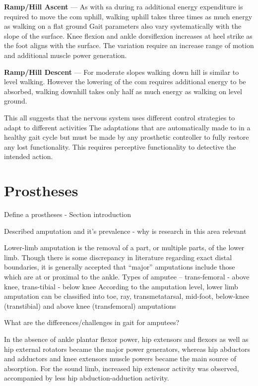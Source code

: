 \textbf{Ramp/Hill Ascent} --- As with \acrshort{sa} during \acrshort{ra} additional energy expenditure is required to move the \acrshort{com} uphill\cite{Franz2012a}, walking uphill takes three times as much energy as walking on a flat ground\cite{Matsumoto2017} Gait parameters also vary systematically with the slope of the surface\cite{Kimel-Naor2017}. Knee flexion and ankle dorsiflexion increases at heel strike as the foot aligns with the surface. The variation require an increase range of motion and additional muscle power generation.\cite{McIntosh2006}

\textbf{Ramp/Hill Descent} --- For moderate slopes walking down hill is similar to level walking. However the lowering of the \acrshort{com} requires additional energy to be absorbed\cite{Franz2012a}, walking downhill takes only half as much energy as walking on level ground\cite{Matsumoto2017}.

This all suggests that the nervous system uses different control strategies to adapt to different activities\cite{Lay2007} The adaptations that are automatically made to in a healthy gait cycle but must be made by any prosthetic controller to fully restore any lost functionality. This requires perceptive functionality to detective the intended action.



\section{Prostheses}
Define a prostheses - Section introduction

Described amputation and it's prevalence - why is research in this area relevant 


Lower-limb amputation is the removal of a part, or multiple parts, of the lower limb. Though there is some discrepancy in literature regarding exact distal boundaries, it is generally accepted that “major” amputations include those which are at or proximal to the ankle.
Types of amputee -- trans-femoral - above knee, trans-tibial - below knee
According to the amputation level, lower limb amputation can be classified into toe, ray, transmetatarsal, mid-foot, below-knee (transtibial) and above knee (transfemoral) amputations

What are the differences/challenges in gait for amputees? 

In the absence of ankle plantar flexor power, hip extensors and flexors as well as hip external rotators became the major power generators, whereas hip abductors and adductors and knee extensors muscle powers became the main source of absorption. For the sound limb, increased hip extensor activity was observed, accompanied by less hip abduction-adduction activity.\cite{Sadeghi2001}

